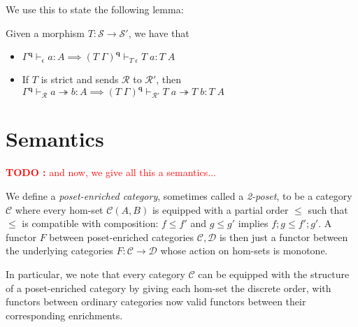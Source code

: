 \documentclass[acmsmall,screen,review]{acmart}
\newcounter{todos}
\newcommand{\TODO}[1]{{
  \stepcounter{todos}
  \begin{center}\large{\textcolor{red}{\textbf{TODO \arabic{todos}:} #1}}\end{center}
}}
\newcommand{\mc}[1]{\ensuremath{\mathcal{#1}}}
\newcommand{\mb}[1]{\ensuremath{\mathbf{#1}}}
\newcommand{\hasty}[4]{#1 \vdash_{#2} #3: {#4}}
\newcommand{\tref}{\twoheadrightarrow}
\newcommand{\tmle}[5]{#1 \vdash_{#2} #3 \tref #4 : {#5}}
\begin{document}
We use this to state the following lemma:
\begin{lemma}
  Given a morphism $T: \mc{S} \to \mc{S}'$, we have that
  \begin{itemize}
    \item $\hasty{\Gamma^{\mb{q}}}{\epsilon}{a}{A} 
      \implies \hasty{(T\;\Gamma)^{\mb{q}}}{T\;\epsilon}{T\;a}{T\;A}$
    \item If $T$ is strict and sends $\mc{R}$ to $\mc{R}'$, then
    $\tmle{\Gamma^{\mb{q}}}{\mc{R}}{a}{b}{A}
      \implies \tmle{(T\;\Gamma)^{\mb{q}}}{\mc{R}'}{T\;a}{T\;b}{T\;A}$
  \end{itemize}
\end{lemma}

\section{Semantics}

\TODO{and now, we give all this a semantics...}

\begin{definition}
  We define a \emph{poset-enriched category}, sometimes called a \emph{2-poset}, to be a category
  $\mc{C}$ where every hom-set $\mc{C}(A, B)$ is equipped with a partial order $\leq$ such that
  $\leq$ is compatible with composition: $f \leq f'$ and $g \leq g'$ implies $f;g \leq f';g'$. A
  functor $F$ between poset-enriched categories $\mc{C}, \mc{D}$ is then just a functor between the
  underlying categories $F : \mc{C} \to \mc{D}$ whose action on hom-sets is monotone.

  In particular, we note that every category $\mc{C}$ can be equipped with the structure of a
  poset-enriched category by giving each hom-set the discrete order, with functors between ordinary
  categories now valid functors between their corresponding enrichments.
\end{definition}
\end{document}
